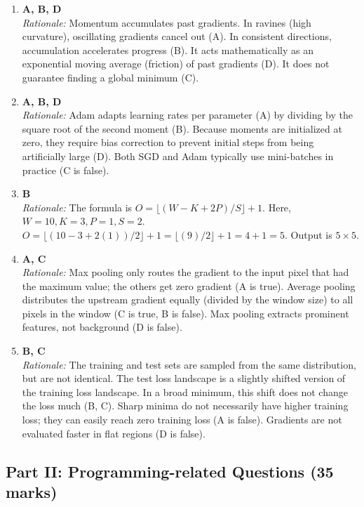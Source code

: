 \documentclass[11pt]{article}
\begin{document}
\begin{enumerate}
    \item \textbf{A, B, D}\\
    \textit{Rationale:} Momentum accumulates past gradients. In ravines (high curvature), oscillating gradients cancel out (A). In consistent directions, accumulation accelerates progress (B). It acts mathematically as an exponential moving average (friction) of past gradients (D). It does not guarantee finding a global minimum (C).

    \item \textbf{A, B, D}\\
    \textit{Rationale:} Adam adapts learning rates per parameter (A) by dividing by the square root of the second moment (B). Because moments are initialized at zero, they require bias correction to prevent initial steps from being artificially large (D). Both SGD and Adam typically use mini-batches in practice (C is false).

    \item \textbf{B}\\
    \textit{Rationale:} The formula is $O = \lfloor(W - K + 2P)/S\rfloor + 1$. Here, $W=10, K=3, P=1, S=2$. 
    $O = \lfloor(10 - 3 + 2(1))/2\rfloor + 1 = \lfloor(9)/2\rfloor + 1 = 4 + 1 = 5$. Output is $5 \times 5$.

    \item \textbf{A, C}\\
    \textit{Rationale:} Max pooling only routes the gradient to the input pixel that had the maximum value; the others get zero gradient (A is true). Average pooling distributes the upstream gradient equally (divided by the window size) to all pixels in the window (C is true, B is false). Max pooling extracts prominent features, not background (D is false).

    \item \textbf{B, C}\\
    \textit{Rationale:} The training and test sets are sampled from the same distribution, but are not identical. The test loss landscape is a slightly shifted version of the training loss landscape. In a broad minimum, this shift does not change the loss much (B, C). Sharp minima do not necessarily have higher training loss; they can easily reach zero training loss (A is false). Gradients are not evaluated faster in flat regions (D is false).
\end{enumerate}

\subsection*{Part II: Programming-related Questions (35 marks)}
\end{document}
